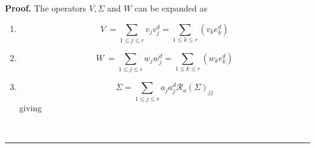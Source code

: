 \documentclass[aps,preprint]{revtex4}%
\newenvironment{proof}[1][Proof]{\noindent\textbf{#1.} }{\ \rule{0.5em}{0.5em}}
\begin{document}
\begin{proof}
The operators $V,\Sigma$ and $W$ can be expanded as

\begin{enumerate}
\item
\begin{equation}
V\mathbf{\ }=\sum_{1\leq j\leq r}v_{j}v_{j}^{d}=\sum_{1\leq k\leq r}\left(
v_{k}e_{k}^{d}\right)
\end{equation}


\item
\begin{equation}
W\mathbf{\ }=\sum_{1\leq j\leq r}w_{j}w_{j}^{d}=\sum_{1\leq k\leq r}\left(
w_{k}e_{k}^{d}\right)
\end{equation}


\item
\begin{equation}
\Sigma=\sum_{1\leq j\leq r}a_{j}a_{j}^{d}\mathcal{R}_{a}\left(  \Sigma\right)
_{jj}%
\end{equation}
giving


\end{enumerate}
\end{proof}
\end{document}
